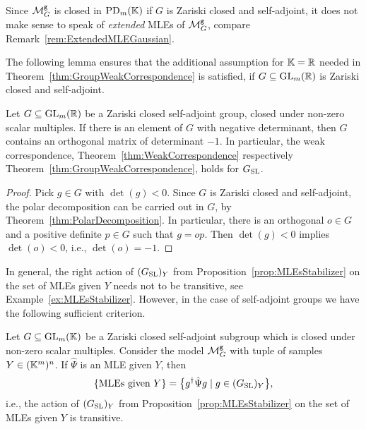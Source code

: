 Since $\mathcal{M}^{\mathtt{g}}_G$ is closed in $\operatorname{PD}_m(\mathbb K)$ if $G$ is Zariski closed and self-adjoint, it does not make sense to speak of \emph{extended} MLEs of $\mathcal{M}^{\mathtt{g}}_G$, compare Remark~\ref{rem:ExtendedMLEGaussian}.

The following lemma ensures that the additional assumption for $\mathbb K = \mathbb R$ needed in Theorem~\ref{thm:GroupWeakCorrespondence} is satisfied, if $G \subseteq \operatorname{GL}_m(\mathbb R)$ is Zariski closed and self-adjoint.

\begin{lemma} \label{lem:OrthogonalMatrixNegativeDet}
	Let $G \subseteq \operatorname{GL}_m(\mathbb R)$ be a Zariski closed self-adjoint group, closed under non-zero scalar multiples. If there is an element of $G$ with negative determinant, then $G$ contains an orthogonal matrix of determinant $-1$. In particular, the weak correspondence, Theorem~\ref{thm:WeakCorrespondence} respectively Theorem~\ref{thm:GroupWeakCorrespondence}, holds for $G_{\operatorname{SL}}$.
\end{lemma}

\begin{proof}
	Pick $g \in G$ with $\det(g) < 0$. Since $G$ is Zariski closed and self-adjoint, the polar decomposition can be carried out in $G$, by Theorem~\ref{thm:PolarDecomposition}. 
	In particular, there is an orthogonal $o \in G$ and a positive definite $p \in G$ such that $g = op$. Then $\det(g) < 0$ implies $\det(o) < 0$, i.e., $\det(o) = -1$.
\end{proof}

In general, the right action of $(G_{\operatorname{SL}})_Y$ from Proposition~\ref{prop:MLEsStabilizer} on the set of MLEs given $Y$ needs not to be transitive, see Example~\ref{ex:MLEsStabilizer}. However, in the case of self-adjoint groups we have the following sufficient criterion.

\begin{prop} \label{prop:MLEsTransitiveStabilizerAction}
	Let $G \subseteq \operatorname{GL}_m(\mathbb K)$ be a Zariski closed self-adjoint subgroup which is closed under non-zero scalar multiples. Consider the model $\mathcal{M}^{\mathtt{g}}_G$ with tuple of samples $Y \in (\mathbb K^m)^n$. If $\hat{\Psi}$ is an MLE given $Y$, then
		\begin{equation}\label{eq:MLEsTransitiveStabilizerAction}
			\{ \text{MLEs given } Y \} = \big\lbrace g^{\dagger} \hat{\Psi} g \mid g \in (G_{\operatorname{SL}})_Y \big\rbrace,
		\end{equation}
	i.e., the action of $(G_{\operatorname{SL}})_Y$ from Proposition~\ref{prop:MLEsStabilizer} on the set of MLEs given $Y$ is transitive.
\end{prop}

